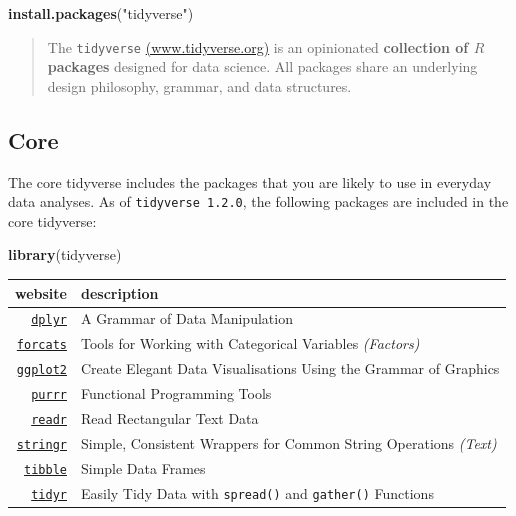 \documentclass[]{book}
\newenvironment{Shaded}{\begin{snugshade}}{\end{snugshade}}
\newcommand{\KeywordTok}[1]{\textcolor[rgb]{0.13,0.29,0.53}{\textbf{#1}}}
\newcommand{\StringTok}[1]{\textcolor[rgb]{0.31,0.60,0.02}{#1}}
\newcommand{\NormalTok}[1]{#1}
\theoremstyle{definition}
\theoremstyle{definition}
\theoremstyle{definition}
\theoremstyle{remark}
\begin{document}
\begin{Shaded}
\begin{Highlighting}[]
\KeywordTok{install.packages}\NormalTok{(}\StringTok{"tidyverse"}\NormalTok{)}
\end{Highlighting}
\end{Shaded}

\begin{quote}
The \texttt{tidyverse}
\href{https://www.tidyverse.org/}{(www.tidyverse.org)} is an opinionated
\textbf{collection of \(R\) packages} designed for data science. All
packages share an underlying design philosophy, grammar, and data
structures.
\end{quote}

\subsection{Core}\label{core}

The core tidyverse includes the packages that you are likely to use in
everyday data analyses. As of \texttt{tidyverse\ 1.2.0}, the following
packages are included in the core tidyverse:

\begin{Shaded}
\begin{Highlighting}[]
\KeywordTok{library}\NormalTok{(tidyverse)}
\end{Highlighting}
\end{Shaded}

\begin{longtable}[]{@{}rl@{}}
\toprule
website & description\tabularnewline
\midrule
\endhead
\href{https://dplyr.tidyverse.org/}{\texttt{dplyr}} & A Grammar of Data
Manipulation\tabularnewline
\href{https://forcats.tidyverse.org/}{\texttt{forcats}} & Tools for
Working with Categorical Variables \emph{(Factors)}\tabularnewline
\href{https://ggplot2.tidyverse.org/}{\texttt{ggplot2}} & Create Elegant
Data Visualisations Using the Grammar of Graphics\tabularnewline
\href{https://purrr.tidyverse.org/}{\texttt{purrr}} & Functional
Programming Tools\tabularnewline
\href{https://readr.tidyverse.org/}{\texttt{readr}} & Read Rectangular
Text Data\tabularnewline
\href{https://stringr.tidyverse.org/}{\texttt{stringr}} & Simple,
Consistent Wrappers for Common String Operations
\emph{(Text)}\tabularnewline
\href{https://tibble.tidyverse.org/}{\texttt{tibble}} & Simple Data
Frames\tabularnewline
\href{https://tidyr.tidyverse.org/}{\texttt{tidyr}} & Easily Tidy Data
with \texttt{spread()} and \texttt{gather()} Functions\tabularnewline
\bottomrule
\end{longtable}
\end{document}
